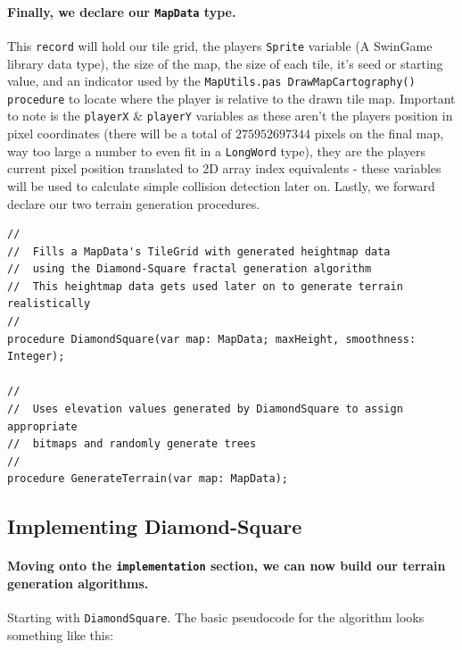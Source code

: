 \documentclass{article}
\begin{document}
\paragraph{Finally, we declare our \texttt{MapData} type.} This \texttt{record} will hold our tile grid, the players \texttt{Sprite} variable (A SwinGame library data type), the size of the map, the size of each tile, it's seed or starting value, and an indicator used by the \texttt{MapUtils.pas DrawMapCartography() procedure} to locate where the player is relative to the drawn tile map. Important to note is the \texttt{playerX} \& \texttt{playerY} variables as these aren't the players position in pixel coordinates (there will be a total of $275952697344$ pixels on the final map, way too large a number to even fit in a \texttt{LongWord} type), they are the players current pixel position translated to 2D array index equivalents - these variables will be used to calculate simple collision detection later on. Lastly, we forward declare our two terrain generation procedures.

\begin{verbatim}
//
//	Fills a MapData's TileGrid with generated heightmap data
//	using the Diamond-Square fractal generation algorithm
//	This heightmap data gets used later on to generate terrain realistically
//
procedure DiamondSquare(var map: MapData; maxHeight, smoothness: Integer);
	
//
//	Uses elevation values generated by DiamondSquare to assign appropriate
//	bitmaps and randomly generate trees
//
procedure GenerateTerrain(var map: MapData);
\end{verbatim}


\pagebreak


\subsection{Implementing Diamond-Square}

\paragraph{Moving onto the \texttt{implementation} section, we can now build our terrain generation algorithms.} Starting with \texttt{DiamondSquare}. The basic pseudocode for the algorithm looks something like this:
\end{document}
